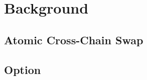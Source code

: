 \section{Background}
\label{sec:background}

\subsection{Atomic Cross-Chain Swap}

\subsection{Option}




